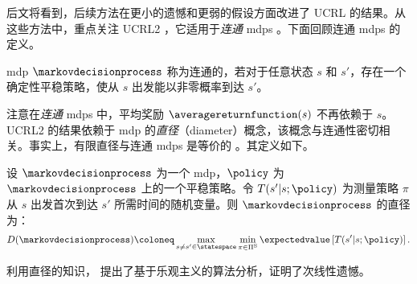 后文将看到，后续方法在更小的遗憾和更弱的假设方面改进了 UCRL 的结果。从这些方法中，重点关注 UCRL2 \cite{auer2008near}，它适用于\emph{连通} \glspl{mdp} \cite[Section~8.3.1]{puterman1994markov}。下面回顾连通 \glspl{mdp} 的定义。

\begin{defi}
\label{def:communicating_mdp}
    \gls{mdp} $\markovdecisionprocess$ 称为连通的，若对于任意状态 $s$ 和 $s'$，存在一个确定性平稳策略，使从 $s$ 出发能以非零概率到达 $s'$。
\end{defi}

注意在\emph{连通} \glspl{mdp} 中，平均奖励 $\averagereturnfunction(s)$ 不再依赖于 $s$。UCRL2 的结果依赖于 \gls{mdp} 的\emph{直径}（diameter）概念，该概念与连通性密切相关。事实上，有限直径与连通 \glspl{mdp} 是等价的 \cite{auer2008near}。其定义如下。

\begin{defi}
\label{def:diameter}
    设 $\markovdecisionprocess$ 为一个 \gls{mdp}，$\policy$ 为 $\markovdecisionprocess$ 上的一个平稳策略。令 $T(s'\vert s;\policy)$ 为测量策略 $\pi$ 从 $s$ 出发首次到达 $s'$ 所需时间的随机变量。则 $\markovdecisionprocess$ 的直径为：
    \begin{align*}
        D(\markovdecisionprocess) \coloneq \max_{s\neq s'\in\statespace}\min_{\pi\in\Pi^{\text{S}}} \expectedvalue\left[T(s'\vert s;\policy)\right].
    \end{align*}
\end{defi}

利用直径的知识，\cite{auer2008near} 提出了基于乐观主义的算法分析，证明了次线性遗憾。

